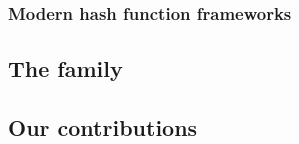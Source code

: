 
\subsubsection{Modern hash function frameworks}
\label{sec:betterhash}

\subsection{The \mdsha family}
\label{sec:mdsha}


\subsection{Our contributions}


